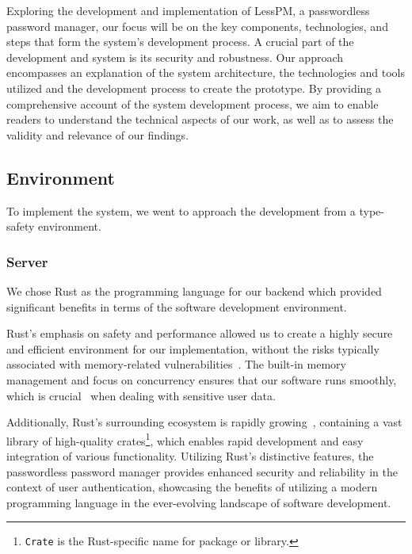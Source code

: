 Exploring the development and implementation of LessPM, a passwordless password
manager, our focus will be on the key components, technologies, and steps
that form the system's development process.
A crucial part of the development and system is its security and robustness.
Our approach encompasses an explanation of the system architecture, the
technologies and tools utilized and the development process to create the
prototype.
By providing a comprehensive account of the system development process, we
aim to enable readers to understand the technical aspects of our work, as well
as to assess the validity and relevance of our findings.

\subsection{Environment}\label{subsec:environment}
To implement the system, we went to approach the development from a type-safety
environment.

\subsubsection{Server}
We chose Rust as the programming language for our backend which provided
significant benefits in terms of the software development environment.

Rust's emphasis on safety and performance allowed us to create a highly
secure and efficient environment for our implementation, without the risks
typically associated with memory-related
vulnerabilities~\cite{rivera2019preserving}.
The built-in memory management and focus on concurrency ensures that our
software runs smoothly, which is crucial~\cite{fischer1985impossibility}
when dealing with sensitive user data.

Additionally, Rust's surrounding ecosystem is rapidly
growing~\cite{librs-stats}, containing a vast library of high-quality
crates\footnote{
  \texttt{Crate} is the Rust-specific name for package or library.
}, which enables rapid development and easy integration of various
functionality.
Utilizing Rust's distinctive features, the passwordless password manager provides
enhanced security and reliability in the context of user authentication,
showcasing the benefits of utilizing a modern programming language in the
ever-evolving landscape of software development.

